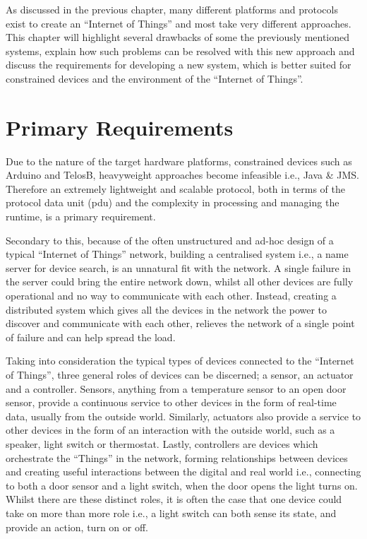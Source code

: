  

As discussed in the previous chapter, many different platforms and protocols exist to create an ``Internet of Things'' and most take very different approaches. This chapter will highlight several drawbacks of some the previously mentioned systems, explain how such problems can be resolved with this new approach and discuss the requirements for developing a new system, which is better suited for constrained devices and the environment of the ``Internet of Things''.

\section{Primary Requirements}
\label{sec:primary_requirements}
Due to the nature of the target hardware platforms, constrained devices such as Arduino and TelosB, heavyweight approaches become infeasible i.e., Java \& JMS. Therefore an extremely lightweight and scalable protocol, both in terms of the protocol data unit (pdu) and the complexity in processing and managing the runtime, is a primary requirement.

Secondary to this, because of the often unstructured and ad-hoc design of a typical ``Internet of Things'' network, building a centralised system i.e., a name server for device search, is an unnatural fit with the network. A single failure in the server could bring the entire network down, whilst all other devices are fully operational and no way to communicate with each other.
Instead, creating a distributed system which gives all the devices in the network the power to discover and communicate with each other, relieves the network of a single point of failure and can help spread the load. %

Taking into consideration the typical types of devices connected to the ``Internet of Things'', three general roles of devices can be discerned; a sensor, an actuator and a controller. Sensors, anything from a temperature sensor to an open door sensor, provide a continuous service to other devices in the form of real-time data, usually from the outside world. Similarly, actuators also provide a service to other devices in the form of an interaction with the outside world, such as a speaker, light switch or thermostat. Lastly, controllers are devices which orchestrate the ``Things'' in the network, forming relationships between devices and creating useful interactions between the digital and real world i.e., connecting to both a door sensor and a light switch, when the door opens the light turns on. Whilst there are these distinct roles, it is often the case that one device could take on more than more role i.e., a light switch can both sense its state, and provide an action, turn on or off.


